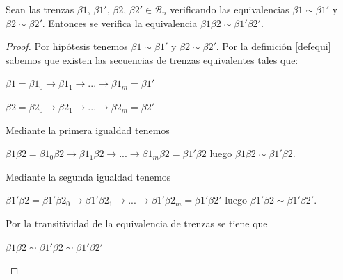 \documentclass[14pt]{extarticle}
\begin{document}
\begin{pro}\label{prod1}
	Sean las trenzas $\beta1$, $\beta1'$, $\beta2$, $\beta2' \in \mathscr{B}_{n}$ verificando las equivalencias $\beta1 \sim \beta1'$ y $\beta2 \sim \beta2'$. Entonces se verifica la equivalencia $\beta1\beta2 \sim \beta1'\beta2'$.
	\begin{proof}
		Por hipótesis tenemos $\beta1 \sim \beta1'$ y $\beta2 \sim \beta2'$. Por la definición \ref{defequi} sabemos que existen las secuencias de trenzas equivalentes tales que: 
		\begin{center}
			$ \beta1 = \beta1_{0} \rightarrow \beta1_{1} \rightarrow ... \rightarrow \beta1_{m}=\beta1'$ 
		\end{center}
		\begin{center}
			$ \beta2 = \beta2_{0} \rightarrow \beta2_{1} \rightarrow ... \rightarrow \beta2_{m}=\beta2'$ 
		\end{center}
		Mediante la primera igualdad tenemos 
		\begin{center}
			$ \beta1\beta2 = \beta1_{0}\beta2 \rightarrow \beta1_{1}\beta2 \rightarrow ... \rightarrow \beta1_{m}\beta2=\beta1'\beta2$ luego $ \beta1\beta2 \sim \beta1'\beta2$.
		\end{center}
		Mediante la segunda igualdad tenemos
		\begin{center}
			$ \beta1'\beta2 = \beta1'\beta2_{0} \rightarrow \beta1'\beta2_{1} \rightarrow ... \rightarrow \beta1'\beta2_{m}=\beta1'\beta2'$ 
			luego $ \beta1'\beta2 \sim \beta1'\beta2'$.
		\end{center}
		Por la transitividad de la equivalencia de trenzas se tiene que
\begin{center}
			 $  \beta1\beta2 \sim \beta1'\beta2 \sim \beta1'\beta2'$	
\end{center}	
				
	\end{proof}
\end{pro}
\end{document}
